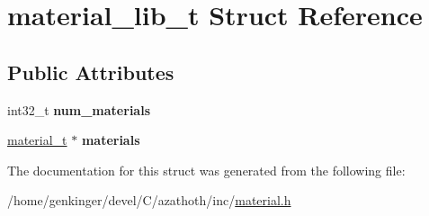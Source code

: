 \hypertarget{structmaterial__lib__t}{}\section{material\+\_\+lib\+\_\+t Struct Reference}
\label{structmaterial__lib__t}
\subsection*{Public Attributes}
\begin{DoxyCompactItemize}
\item 
\mbox{\label{structmaterial__lib__t_a0190b49f52dbd2d9aa90de0a2a43b583}} 
int32\+\_\+t {\bfseries num\+\_\+materials}
\item 
\mbox{\label{structmaterial__lib__t_a61dd8ea7892a175a18a01d680dcaeb23}} 
\mbox{\hyperlink{structmaterial__t}{material\+\_\+t}} $\ast$ {\bfseries materials}
\end{DoxyCompactItemize}


The documentation for this struct was generated from the following file\+:\begin{DoxyCompactItemize}
\item 
/home/genkinger/devel/\+C/azathoth/inc/\mbox{\hyperlink{material_8h}{material.\+h}}\end{DoxyCompactItemize}
